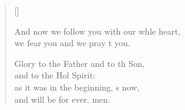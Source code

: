 \begin{verse}[\versewidth]
\begin{patverse}
And now we follow you with our whle heart,\Med\\
we fear you and we pray t you.

Glory to the Father and to th Son,\Med\\
    and to the Hol Spirit:\\
as it was in the beginning, \pointup{\i}s now,\Med\\
    and will be for ever. men.
  \end{patverse}
\end{verse}
